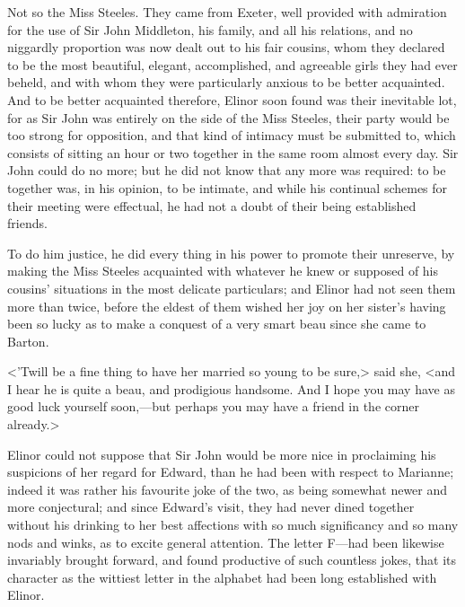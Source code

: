 Not so the Miss Steeles. They came from Exeter, well provided with admiration for the use of Sir John Middleton, his family, and all his relations, and no niggardly proportion was now dealt out to his fair cousins, whom they declared to be the most beautiful, elegant, accomplished, and agreeable girls they had ever beheld, and with whom they were particularly anxious to be better acquainted. And to be better acquainted therefore, Elinor soon found was their inevitable lot, for as Sir John was entirely on the side of the Miss Steeles, their party would be too strong for opposition, and that kind of intimacy must be submitted to, which consists of sitting an hour or two together in the same room almost every day. Sir John could do no more; but he did not know that any more was required: to be together was, in his opinion, to be intimate, and while his continual schemes for their meeting were effectual, he had not a doubt of their being established friends.

To do him justice, he did every thing in his power to promote their unreserve, by making the Miss Steeles acquainted with whatever he knew or supposed of his cousins' situations in the most delicate particulars; and Elinor had not seen them more than twice, before the eldest of them wished her joy on her sister's having been so lucky as to make a conquest of a very smart beau since she came to Barton.

<'Twill be a fine thing to have her married so young to be sure,> said she, <and I hear he is quite a beau, and prodigious handsome. And I hope you may have as good luck yourself soon,—but perhaps you may have a friend in the corner already.>

Elinor could not suppose that Sir John would be more nice in proclaiming his suspicions of her regard for Edward, than he had been with respect to Marianne; indeed it was rather his favourite joke of the two, as being somewhat newer and more conjectural; and since Edward's visit, they had never dined together without his drinking to her best affections with so much significancy and so many nods and winks, as to excite general attention. The letter F—had been likewise invariably brought forward, and found productive of such countless jokes, that its character as the wittiest letter in the alphabet had been long established with Elinor.




